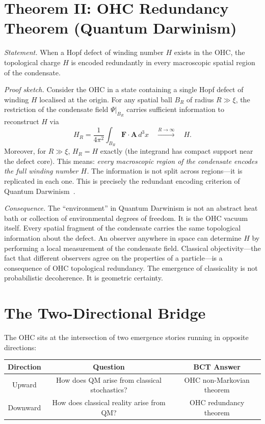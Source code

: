 \documentclass[aps,prl,preprint,superscriptaddress,floatfix]{revtex4-2}
\begin{document}
\section{Theorem II: OHC Redundancy Theorem (Quantum Darwinism)}

\textit{Statement.} When a Hopf defect of winding number $H$ exists in the
OHC, the topological charge $H$ is encoded redundantly in every macroscopic
spatial region of the condensate.

\textit{Proof sketch.} Consider the OHC in a state containing a single Hopf
defect of winding $H$ localised at the origin. For any spatial ball
$B_R$ of radius $R\gg\xi$, the restriction of the condensate field
$\Psi|_{B_R}$ carries sufficient information to reconstruct $H$ via
\begin{equation}
H_R = \frac{1}{4\pi^2}\int_{B_R} \mathbf{F}\cdot\mathbf{A}\,d^3x
\quad\xrightarrow{R\to\infty}\quad H.
\end{equation}
Moreover, for $R\gg\xi$, $H_R = H$ exactly (the integrand has compact
support near the defect core). This means: \textit{every macroscopic region
of the condensate encodes the full winding number $H$.} The information is
not split across regions---it is replicated in each one. This is precisely
the redundant encoding criterion of Quantum Darwinism~\cite{zurek2003}.

\textit{Consequence.} The ``environment'' in Quantum Darwinism is not an
abstract heat bath or collection of environmental degrees of freedom. It is
the OHC vacuum itself. Every spatial fragment of the condensate carries the
same topological information about the defect. An observer anywhere in space
can determine $H$ by performing a local measurement of the condensate field.
Classical objectivity---the fact that different observers agree on the
properties of a particle---is a consequence of OHC topological redundancy.
The emergence of classicality is not probabilistic decoherence. It is
geometric certainty.

\section{The Two-Directional Bridge}

The OHC sits at the intersection of two emergence stories running in opposite
directions:

\begin{center}
\begin{tabular}{ccc}
\toprule
Direction & Question & BCT Answer \\
\midrule
Upward & How does QM arise from classical stochastics? & OHC non-Markovian theorem \\
Downward & How does classical reality arise from QM? & OHC redundancy theorem \\
\bottomrule
\end{tabular}
\end{center}
\end{document}
